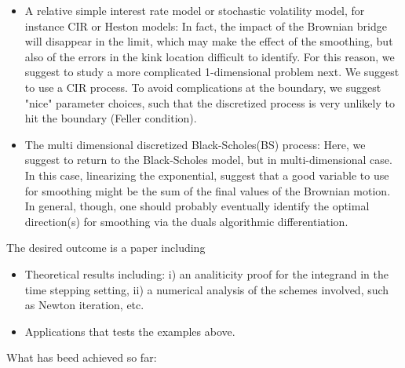 \documentclass[11pt]{article}
\begin{document}
\begin{itemize}
\begin{itemize}
		\item A relative simple interest rate model or stochastic volatility model, for instance CIR or Heston models: In fact,  the impact of the Brownian bridge will disappear in the limit, which may make the effect of the smoothing, 	but also of the errors in the kink location difficult to identify. For 	this reason, we suggest to study a more complicated 1-dimensional 	problem next. We suggest to use a CIR process. To avoid complications at the boundary, we suggest "nice" parameter choices, such that the discretized process is very unlikely to hit the boundary (Feller
		condition).
		\item The multi dimensional discretized Black-Scholes(BS) process: Here, we suggest to
		return to the Black-Scholes model, but in multi-dimensional case. In this case,	linearizing the exponential, suggest that a good variable to use for smoothing might be the sum of the final values of the Brownian motion.
		In general, though, one should probably eventually identify the	optimal direction(s) for smoothing via the duals algorithmic	differentiation.
	\end{itemize}
\end{itemize}




The desired  outcome is a paper including 
\begin{itemize}
		\item Theoretical results including: i) an analiticity proof for the integrand in the time stepping setting, ii) a numerical analysis of the schemes involved, such as Newton iteration, etc.
	\item Applications that  tests the examples above.

\end{itemize}



What has beed achieved so far: 
\end{document}
